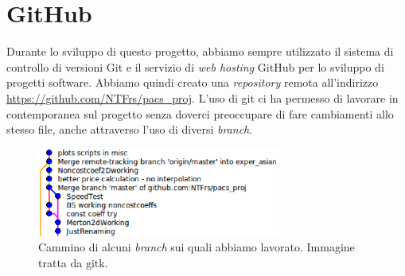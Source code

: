\documentclass[a4paper,10pt]{report}
\theoremstyle{plain}
\theoremstyle{definition}
\theoremstyle{remark}
\begin{document}
\section{GitHub}
Durante lo sviluppo di questo progetto, abbiamo sempre utilizzato il sistema di controllo di versioni Git e il servizio di \emph{web hosting} GitHub per lo sviluppo di progetti software. Abbiamo quindi creato una \emph{repository} remota all'indirizzo \url{https://github.com/NTFrs/pacs_proj}. L'uso di git ci ha permesso di lavorare in contemporanea sul progetto senza doverci preoccupare di fare cambiamenti allo stesso file, anche attraverso l'uso di diversi \emph{branch}.
\begin{figure}[!htb]
 \begin{center}
 \includegraphics[width=8cm]{img/Git.eps}
 \caption{Cammino di alcuni \emph{branch} sui quali abbiamo lavorato. Immagine tratta da \textsf{gitk}.}
 \label{fig:gitk}
 \end{center}
\end{figure}
\end{document}

